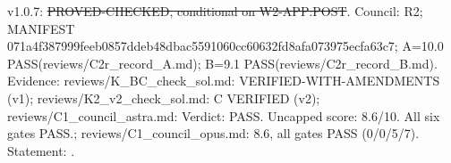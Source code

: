 \begin{proposition}\label{reg:W3-POST2_C}
\end{proposition}
\begin{statusbox}
 v1.0.7: \st{PROVED-CHECKED, conditional on W2-APP:POST}. Council: R2; MANIFEST 071a4f387999feeb0857ddeb48dbac5591060cc60632fd8afa073975ecfa63c7; A=10.0 PASS(reviews/C2r\_record\_A.md); B=9.1 PASS(reviews/C2r\_record\_B.md). Evidence: reviews/K\_BC\_check\_sol.md: VERIFIED-WITH-AMENDMENTS (v1); reviews/K2\_v2\_check\_sol.md: C VERIFIED (v2); reviews/C1\_council\_astra.md: Verdict: PASS. Uncapped score: 8.6/10. All six gates PASS.; reviews/C1\_council\_opus.md: 8.6, all gates PASS (0/0/5/7). Statement: .
\end{statusbox}
